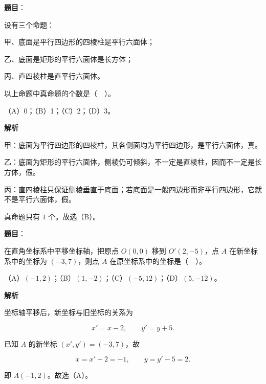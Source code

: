 \begin{answer}

\textbf{题目}：

设有三个命题：

甲、底面是平行四边形的四棱柱是平行六面体；

乙、底面是矩形的平行六面体是长方体；

丙、直四棱柱是直平行六面体。

以上命题中真命题的个数是（　）。

（A）0；（B）1；（C）2；（D）3。

\textbf{解析}

甲：底面为平行四边形的四棱柱，其各侧面均为平行四边形，是平行六面体，真。

乙：底面为矩形的平行六面体，侧棱仍可倾斜，不一定是直棱柱，因而不一定是长方体，假。

丙：直四棱柱只保证侧棱垂直于底面；若底面是一般四边形而非平行四边形，它就不是平行六面体，假。

真命题只有 $1$ 个。故选（B）。


\end{answer}
\begin{answer}

\textbf{题目}：

在直角坐标系中平移坐标轴，把原点 $O(0,0)$ 移到 $O'(2,-5)$，点 $A$ 在新坐标系中的坐标为 $(-3,7)$，则点 $A$ 在原坐标系中的坐标是（　）。

（A）$(-1,2)$；（B）$(1,-2)$；（C）$(-5,12)$；（D）$(5,-12)$。

\textbf{解析}

坐标轴平移后，新坐标与旧坐标的关系为

\nopagebreak[4]
\[
x'=x-2,\qquad y'=y+5.
\]

已知 $A$ 的新坐标 $(x',y')=(-3,7)$，故

\nopagebreak[4]
\[
x=x'+2=-1,\qquad y=y'-5=2.
\]

即 $A(-1,2)$。故选（A）。


\end{answer}
